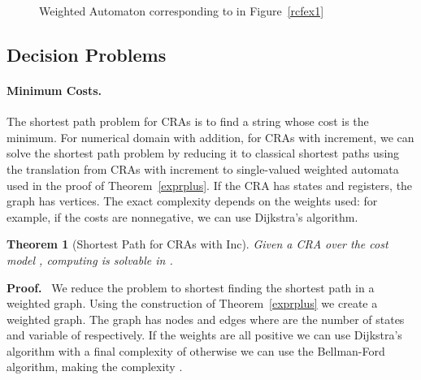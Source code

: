 \documentclass[11pt]{article}
\newtheorem{theorem}{Theorem}
\def\Proof{{\bf Proof.}}
\def\qed{{\bf }}
\newcommand{\mypar}[1]{\subsection{#1}}
\def\qed{{\bf }}
\begin{document}
\begin{figure}[t]
\centering
{}
\caption{Weighted Automaton corresponding to  in Figure~\ref{rcfex1}\label{wam1}}
\end{figure}


\mypar{Decision Problems}
\paragraph{Minimum Costs.}
The shortest path problem for CRAs is to
find a string  whose cost is the minimum.
For numerical domain with addition, for CRAs with increment, we can solve the shortest path problem by reducing
it to classical shortest paths using the translation from CRAs with increment to single-valued weighted automata
used in the proof of Theorem~\ref{exprplus}.
If the CRA has  states and  registers, the graph has  vertices.
The exact complexity depends on the weights used: for example, if
the costs are nonnegative, we can use Dijkstra's algorithm.

\begin{theorem}[Shortest Path for CRAs with Inc]\label{pEDWAmcp}
Given a CRA  over the cost model , computing 
is solvable in .
\end{theorem}

\Proof~ We reduce the problem to shortest finding the shortest path in
a weighted graph. Using the construction of Theorem~\ref{exprplus} we
create a weighted graph. The graph has  nodes and
 edges where  are the number of states and variable of  respectively.  If the weights are all positive we can use
Dijkstra's algorithm with a final complexity of
 otherwise we can use
the Bellman-Ford algorithm, making the complexity .  \qed \\
\end{document}
